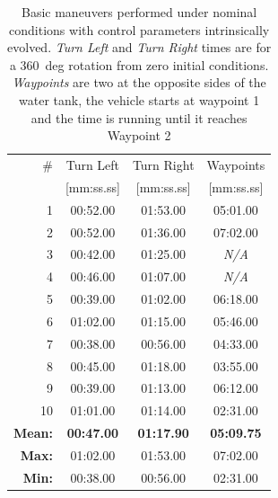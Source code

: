 \begin{table}
\centering
\renewcommand{\arraystretch}{1.0}
\begin{tabular}{rccc}
\hline
\# & Turn Left & Turn Right & Waypoints\\
 & [mm:ss.ss] & [mm:ss.ss] & [mm:ss.ss]\\
\hline
\rowcolor{Gray}
1 & 00:52.00 & 01:53.00 & 05:01.00\\
2 & 00:52.00 & 01:36.00 & 07:02.00\\
\rowcolor{Gray}
3 & 00:42.00 & 01:25.00 & \textit{N/A}\\
4 & 00:46.00 & 01:07.00 & \textit{N/A}\\
\rowcolor{Gray}
5 & 00:39.00 & 01:02.00 & 06:18.00\\
6 & 01:02.00 & 01:15.00 & 05:46.00\\
\rowcolor{Gray}
7 & 00:38.00 & 00:56.00 & 04:33.00\\
8 & 00:45.00 & 01:18.00 & 03:55.00\\
\rowcolor{Gray}
9 & 00:39.00 & 01:13.00 & 06:12.00\\
10 & 01:01.00 & 01:14.00 & 02:31.00\\
\hline
\textbf{Mean:} & \textbf{00:47.00} & \textbf{01:17.90} & \textbf{05:09.75}\\
\textbf{Max:} & 01:02.00 & 01:53.00 & 07:02.00\\
\textbf{Min:} & 00:38.00 & 00:56.00 & 02:31.00\\
\hline
\end{tabular}
\newline
\caption[Basic maneuvers performed under nominal conditions]{Basic maneuvers performed under nominal conditions with control parameters intrinsically evolved. \textit{Turn Left} and \textit{Turn Right} times are for a 360~deg rotation from zero initial conditions. \textit{Waypoints} are two at the opposite sides of the water tank, the vehicle starts at waypoint 1 and the time is running until it reaches Waypoint 2}
\label{tab:times-normal}
\end{table}

